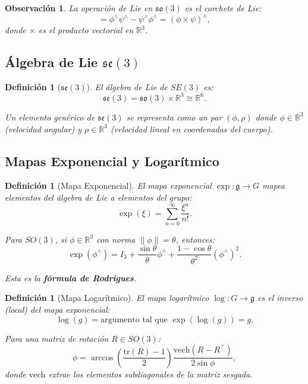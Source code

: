 \documentclass[11pt,a4paper]{article}
\newtheorem{definition}[theorem]{Definición}
\newtheorem{remark}[theorem]{Observación}
\begin{document}
\begin{remark}
La operación de Lie en $\mathfrak{so}(3)$ es el \emph{corchete de Lie}:
\begin{equation}
    [\phi, \psi] = \phi^\wedge \psi^\wedge - \psi^\wedge \phi^\wedge = (\phi \times \psi)^\wedge,
\end{equation}
donde $\times$ es el producto vectorial en $\mathbb{R}^3$.
\end{remark}

\subsection{Álgebra de Lie $\mathfrak{se}(3)$}

\begin{definition}[$\mathfrak{se}(3)$]
El álgebra de Lie de $SE(3)$ es:
\begin{equation}
    \mathfrak{se}(3) = \mathfrak{so}(3) \times \mathbb{R}^3 \cong \mathbb{R}^6.
\end{equation}

Un elemento genérico de $\mathfrak{se}(3)$ se representa como un par $(\phi, \rho)$ donde $\phi \in \mathbb{R}^3$ (velocidad angular) y $\rho \in \mathbb{R}^3$ (velocidad lineal en coordenadas del cuerpo).
\end{definition}

\subsection{Mapas Exponencial y Logarítmico}

\begin{definition}[Mapa Exponencial]
El \emph{mapa exponencial} $\exp: \mathfrak{g} \to G$ mapea elementos del álgebra de Lie a elementos del grupo:
\begin{equation}
    \exp(\xi) = \sum_{n=0}^{\infty} \frac{\xi^n}{n!}.
\end{equation}

Para $SO(3)$, si $\phi \in \mathbb{R}^3$ con norma $\|\phi\| = \theta$, entonces:
\begin{equation}
    \exp(\phi^\wedge) = I_3 + \frac{\sin\theta}{\theta}\phi^\wedge + \frac{1-\cos\theta}{\theta^2}(\phi^\wedge)^2.
\end{equation}

Esta es la \textbf{fórmula de Rodrigues}.
\end{definition}

\begin{definition}[Mapa Logarítmico]
El \emph{mapa logarítmico} $\log: G \to \mathfrak{g}$ es el inverso (local) del mapa exponencial:
\begin{equation}
    \log(g) = \text{argumento tal que } \exp(\log(g)) = g.
\end{equation}

Para una matriz de rotación $R \in SO(3)$:
\begin{equation}
    \phi = \arccos\left(\frac{\text{tr}(R)-1}{2}\right) \frac{\text{vech}(R - R^\top)}{2\sin\phi},
\end{equation}
donde $\text{vech}$ extrae los elementos subdiagonales de la matriz sesgada.
\end{definition}
\end{document}
